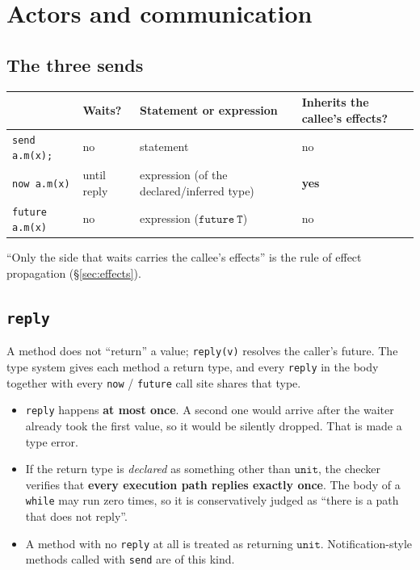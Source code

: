 \documentclass[11pt,a4paper]{article}
\newcommand{\ty}[1]{\ensuremath{\mathtt{#1}}}
\begin{document}
\section{Actors and communication}

\subsection{The three sends}

\begin{center}
\begin{tabular}{@{}llll@{}}
\toprule
 & Waits? & Statement or expression & Inherits the callee's effects? \\
\midrule
\texttt{send a.m(x);}      & no          & statement & no \\
\texttt{now a.m(x)}        & until reply & expression (of the declared/inferred type) & \textbf{yes} \\
\texttt{future a.m(x)}     & no          & expression (\ty{future\ T}) & no \\
\bottomrule
\end{tabular}
\end{center}

``Only the side that waits carries the callee's effects'' is the rule of effect
propagation (\S\ref{sec:effects}).

\subsection{\texttt{reply}}

A method does not ``return'' a value; \texttt{reply(v)} resolves the caller's
future. The type system gives each method a return type, and every
\texttt{reply} in the body together with every \texttt{now} / \texttt{future}
call site shares that type.

\begin{itemize}
\item \texttt{reply} happens \textbf{at most once}. A second one would arrive
  after the waiter already took the first value, so it would be silently
  dropped. That is made a type error.
\item If the return type is \emph{declared} as something other than \ty{unit},
  the checker verifies that \textbf{every execution path replies exactly once}.
  The body of a \texttt{while} may run zero times, so it is conservatively
  judged as ``there is a path that does not reply''.
\item A method with no \texttt{reply} at all is treated as returning \ty{unit}.
  Notification-style methods called with \texttt{send} are of this kind.
\end{itemize}
\end{document}

